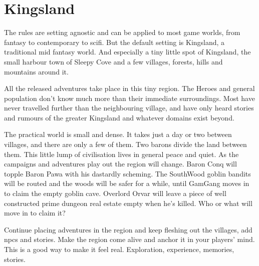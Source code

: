 \clearpage %


\section*{Kingsland}

The rules are setting agnostic and can be applied to most game worlds, from fantasy to contemporary to scifi. But the default setting is Kingsland, a traditional mid fantasy world. And especially a tiny little spot of Kingsland, the small harbour town of Sleepy Cove and a few villages, forests, hills and mountains around it.

All the released adventures take place in this tiny region. The Heroes and general population don't know much more than their immediate surroundings. Most have never travelled further than the neighbouring village, and have only heard stories and rumours of the greater Kingsland and whatever domains exist beyond.

The practical world is small and dense. It takes just a day or two between villages, and there are only a few of them. Two barons divide the land between them. This little lump of civilisation lives in general peace and quiet. As the campaigns and adventures play out the region will change. Baron Conq will topple Baron Pawa with his dastardly scheming. The SouthWood goblin bandits will be routed and the woods will be safer for a while, until GamGang moves in to claim the empty goblin cave. Overlord Orvar will leave a piece of well constructed prime dungeon real estate empty when he's killed. Who or what will move in to claim it?

Continue placing adventures in the region and keep fleshing out the villages, add npcs and stories. Make the region come alive and anchor it in your players' mind. This is a good way to make it feel real. Exploration, experience, memories, stories.



\vfill

